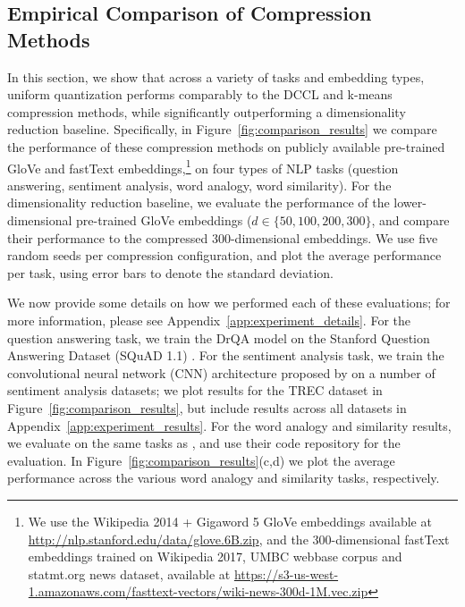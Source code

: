 \subsection{Empirical Comparison of Compression Methods}
\label{sec:exp_comparison}
In this section, we show that across a variety of tasks and embedding types, uniform quantization performs comparably to the DCCL and k-means compression methods, while significantly outperforming a dimensionality reduction baseline.
Specifically, in Figure~\ref{fig:comparison_results} we compare the performance of these compression methods on publicly available pre-trained GloVe and fastText embeddings,\footnote{We use the Wikipedia 2014 + Gigaword 5 GloVe embeddings available at \url{http://nlp.stanford.edu/data/glove.6B.zip}, and the 300-dimensional fastText embeddings trained on Wikipedia 2017, UMBC webbase corpus and statmt.org news dataset, available at \url{https://s3-us-west-1.amazonaws.com/fasttext-vectors/wiki-news-300d-1M.vec.zip}}
on four types of NLP tasks (question answering, sentiment analysis, word analogy, word similarity).
For the dimensionality reduction baseline, we evaluate the performance of the lower-dimensional pre-trained GloVe embeddings ($d\in\{50,100,200,300\}$, and compare their performance to the compressed 300-dimensional embeddings.
We use five random seeds per compression configuration, and plot the average performance per task, using error bars to denote the standard deviation.

We now provide some details on how we performed each of these evaluations; for more information, please see Appendix~\ref{app:experiment_details}.
For the question answering task, we train the DrQA model \citep{drqa17} on the Stanford Question Answering Dataset (SQuAD 1.1) \citep{squad16}.
For the sentiment analysis task, we train the convolutional neural network (CNN) architecture proposed by \citet{kim14} on a number of sentiment analysis datasets; we plot results for the TREC dataset in Figure~\ref{fig:comparison_results}, but include results across all datasets in Appendix~\ref{app:experiment_results}.
For the word analogy and similarity results, we evaluate on the same tasks as \citet{levy15}, and use their code repository for the evaluation.
In Figure~\ref{fig:comparison_results}(c,d) we plot the average performance across the various word analogy and similarity tasks, respectively.

